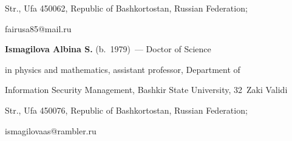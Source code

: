 Str., Ufa 450062, Republic of Bashkortostan,  Russian Federation; 

\mbox{fairusa85@mail.ru}



\vspace*{3pt}



\noindent

\textbf{Ismagilova Albina S.} (b.\ 1979)~--- Doctor of Science

in physics and mathematics, assistant professor, Department of 

Information Security Management, Bashkir State University, 32~Zaki Validi 

Str., Ufa 450076, Republic of Bashkortostan, Russian Federation; 

\mbox{ismagilovaas@rambler.ru} 



\label{end\stat}





\renewcommand{\bibname}{\protect\rm Литература}

